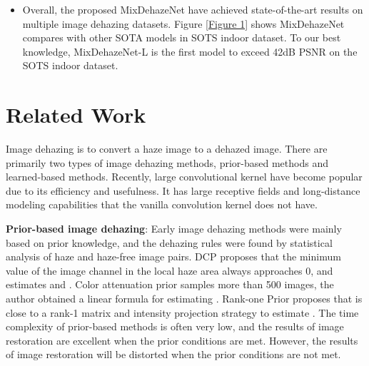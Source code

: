 \documentclass[10pt,twocolumn,letterpaper]{article}
\begin{document}
\begin{itemize}
    \item Overall, the proposed MixDehazeNet have achieved state-of-the-art results on multiple image dehazing datasets. Figure \ref{Figure 1} shows MixDehazeNet compares with other SOTA models in SOTS indoor dataset. To our best knowledge, MixDehazeNet-L is the first model to exceed 42dB PSNR on the SOTS indoor dataset.
\end{itemize}






















\section{Related Work} 
Image dehazing is to convert a haze image to a dehazed image. There are primarily two types of image dehazing methods, prior-based methods and learned-based methods. Recently, large convolutional kernel have become popular due to its efficiency and usefulness. It has large receptive fields and long-distance modeling capabilities that the vanilla convolution kernel does not have.

{\bfseries Prior-based image dehazing}: Early image dehazing methods were mainly based on prior knowledge, and the dehazing rules were found by statistical analysis of haze and haze-free image pairs. DCP \cite{he2010single} proposes that the minimum value of the image channel in the local haze area always approaches 0, and estimates  and . Color attenuation prior samples more than 500 images, the author obtained a linear formula for estimating . Rank-one Prior \cite{rank-one} proposes that  is close to a rank-1 matrix and intensity projection strategy to estimate . The time complexity of prior-based methods is often very low, and the results of image restoration are excellent when the prior conditions are met. However, the results of image restoration will be distorted when the prior conditions are not met.
\end{document}
